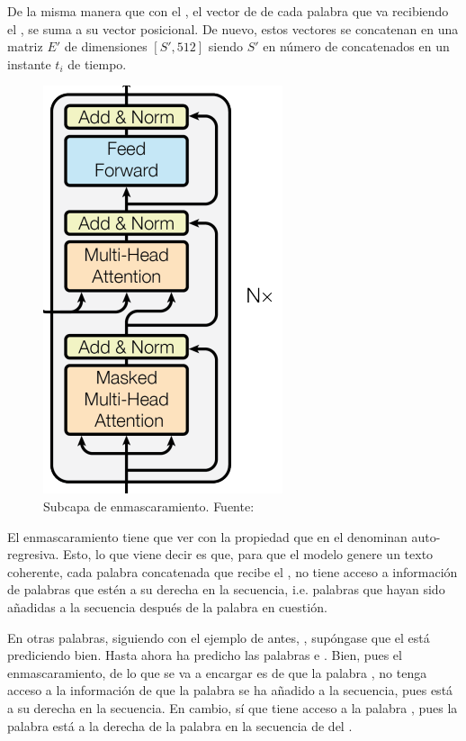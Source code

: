 De la misma manera que con el , el vector de  de cada palabra que va recibiendo el , se suma a su vector posicional. De nuevo, estos vectores se concatenan en una matriz $E'$ de dimensiones $[S', 512]$ siendo $S'$ en número de  concatenados en un instante $t_i$ de tiempo.


\begin{figure}[H]
    \centering
    \includegraphics[scale = 0.7]{imgs/trans_arq_4.png}
    \caption{Subcapa de enmascaramiento. \scriptsize{Fuente: \parencite{transformers}}}
    \label{enmcascaramiento}
\end{figure}

El enmascaramiento tiene que ver  con la propiedad que en el  denominan auto-regresiva.  Esto, lo que viene decir es que, para que el modelo genere un texto coherente, cada palabra concatenada que recibe el , no tiene acceso a información de palabras que estén a su derecha en la secuencia, i.e. palabras que hayan sido añadidas a la secuencia después de la palabra en cuestión.

En otras palabras, siguiendo con el ejemplo de antes, \ul{}, supóngase que el  está prediciendo bien. Hasta ahora ha predicho las palabras  e . Bien, pues el enmascaramiento, de lo que se va a encargar es de que la palabra , no tenga acceso a la información de que la palabra  se ha añadido a la secuencia, pues está a su derecha en la secuencia. En cambio,  sí que tiene acceso a la palabra , pues la palabra  está a la derecha de la palabra  en la secuencia de  del .


